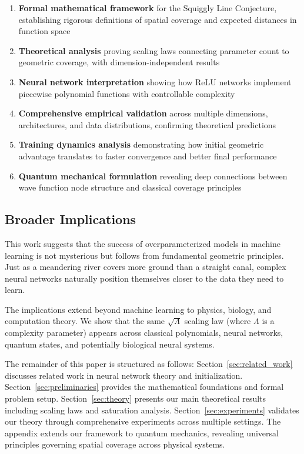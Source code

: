 \begin{enumerate}
    \item \textbf{Formal mathematical framework} for the Squiggly Line Conjecture, establishing rigorous definitions of spatial coverage and expected distances in function space
    \item \textbf{Theoretical analysis} proving scaling laws connecting parameter count to geometric coverage, with dimension-independent results
    \item \textbf{Neural network interpretation} showing how ReLU networks implement piecewise polynomial functions with controllable complexity
    \item \textbf{Comprehensive empirical validation} across multiple dimensions, architectures, and data distributions, confirming theoretical predictions
    \item \textbf{Training dynamics analysis} demonstrating how initial geometric advantage translates to faster convergence and better final performance
    \item \textbf{Quantum mechanical formulation} revealing deep connections between wave function node structure and classical coverage principles
\end{enumerate}

\subsection{Broader Implications}

This work suggests that the success of overparameterized models in machine learning is not mysterious but follows from fundamental geometric principles. Just as a meandering river covers more ground than a straight canal, complex neural networks naturally position themselves closer to the data they need to learn.

The implications extend beyond machine learning to physics, biology, and computation theory. We show that the same $\sqrt{\Lambda}$ scaling law (where $\Lambda$ is a complexity parameter) appears across classical polynomials, neural networks, quantum states, and potentially biological neural systems.

The remainder of this paper is structured as follows: Section~\ref{sec:related_work} discusses related work in neural network theory and initialization. Section~\ref{sec:preliminaries} provides the mathematical foundations and formal problem setup. Section~\ref{sec:theory} presents our main theoretical results including scaling laws and saturation analysis. Section~\ref{sec:experiments} validates our theory through comprehensive experiments across multiple settings. The appendix extends our framework to quantum mechanics, revealing universal principles governing spatial coverage across physical systems.
